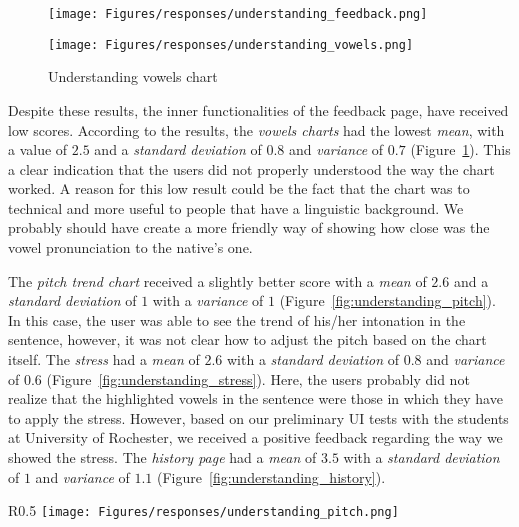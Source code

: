 \begin{figure}[!ht]
	\centering
	\begin{minipage}{.5\textwidth}
		\centering
		\texttt{[image: Figures/responses/understanding\_feedback.png]}
		\caption{Understanding feedback page}
		\label{fig:understanding_feedback}
	\end{minipage}%
	\begin{minipage}{.5\textwidth}
		\centering
		\texttt{[image: Figures/responses/understanding\_vowels.png]}
		\caption{Understanding vowels chart}
		\label{fig:understanding_vowels}
	\end{minipage}
\end{figure}

Despite these results, the inner functionalities of the feedback page, have received low scores. According to the results, the \textit{vowels charts} had the lowest \textit{mean}, with a value of $2.5$ and a \textit{standard deviation} of $0.8$ and \textit{variance} of $0.7$ (Figure~\ref{fig:understanding_vowels}). This a clear indication that the users did not properly understood the way the chart worked. A reason for this low result could be the fact that the chart was to technical and more useful to people that have a linguistic background. We probably should have create a more friendly way of showing how close was the vowel pronunciation to the native's one.

The \textit{pitch trend chart} received a slightly better score with a \textit{mean} of $2.6$ and a \textit{standard deviation} of $1$ with a \textit{variance} of $1$ (Figure~\ref{fig:understanding_pitch}). In this case, the user was able to see the trend of his/her intonation in the sentence, however, it was not clear how to adjust the pitch based on the chart itself.
\noindent The \textit{stress} had a \textit{mean} of $2.6$ with a \textit{standard deviation} of $0.8$ and \textit{variance} of $0.6$ (Figure~\ref{fig:understanding_stress}). Here, the users probably did not realize that the highlighted vowels in the sentence were those in which they have to apply the stress. However, based on our preliminary UI tests with the students at University of Rochester, we received a positive feedback regarding the way we showed the stress. 
The \textit{history page} had a \textit{mean} of $3.5$ with a \textit{standard deviation} of $1$ and \textit{variance} of $1.1$ (Figure~\ref{fig:understanding_history}).

\begin{wrapfigure}{R}{0.5\textwidth}
	\centering
	\texttt{[image: Figures/responses/understanding\_pitch.png]}
	\caption{Understanding pitch trend}
	\label{fig:understanding_pitch}
\end{wrapfigure}

